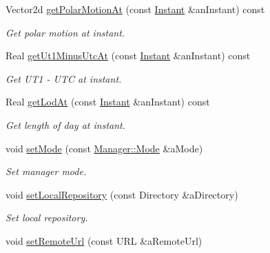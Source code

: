 \begin{DoxyCompactItemize}
Vector2d \hyperlink{classlibrary_1_1physics_1_1coord_1_1frame_1_1provider_1_1iers_1_1_manager_a3023a701ae8b2abf5a93e9c0c46db37a}{get\+Polar\+Motion\+At} (const \hyperlink{classlibrary_1_1physics_1_1time_1_1_instant}{Instant} \&an\+Instant) const
\begin{DoxyCompactList}\small\item\em Get polar motion at instant. \end{DoxyCompactList}\item 
Real \hyperlink{classlibrary_1_1physics_1_1coord_1_1frame_1_1provider_1_1iers_1_1_manager_a67749dc760378bc56c82cc752833e4d9}{get\+Ut1\+Minus\+Utc\+At} (const \hyperlink{classlibrary_1_1physics_1_1time_1_1_instant}{Instant} \&an\+Instant) const
\begin{DoxyCompactList}\small\item\em Get U\+T1 -\/ U\+TC at instant. \end{DoxyCompactList}\item 
Real \hyperlink{classlibrary_1_1physics_1_1coord_1_1frame_1_1provider_1_1iers_1_1_manager_a4d8b3d53fb06128050357682ee09d816}{get\+Lod\+At} (const \hyperlink{classlibrary_1_1physics_1_1time_1_1_instant}{Instant} \&an\+Instant) const
\begin{DoxyCompactList}\small\item\em Get length of day at instant. \end{DoxyCompactList}\item 
void \hyperlink{classlibrary_1_1physics_1_1coord_1_1frame_1_1provider_1_1iers_1_1_manager_a2473f7f59392ba22053f1cdf03626c21}{set\+Mode} (const \hyperlink{classlibrary_1_1physics_1_1coord_1_1frame_1_1provider_1_1iers_1_1_manager_a84f44554ac04c5e18ed7ff448debf392}{Manager\+::\+Mode} \&a\+Mode)
\begin{DoxyCompactList}\small\item\em Set manager mode. \end{DoxyCompactList}\item 
void \hyperlink{classlibrary_1_1physics_1_1coord_1_1frame_1_1provider_1_1iers_1_1_manager_a60e767b159f287aa7a1a3e9c5a01e0ae}{set\+Local\+Repository} (const Directory \&a\+Directory)
\begin{DoxyCompactList}\small\item\em Set local repository. \end{DoxyCompactList}\item 
void \hyperlink{classlibrary_1_1physics_1_1coord_1_1frame_1_1provider_1_1iers_1_1_manager_ab764c676a7db8883d7896e129eac5605}{set\+Remote\+Url} (const U\+RL \&a\+Remote\+Url)

\end{DoxyCompactItemize}
